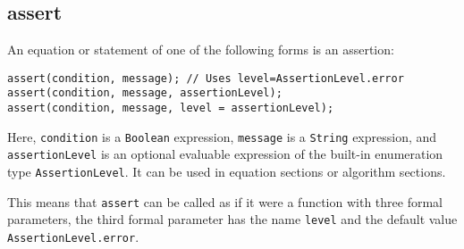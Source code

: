 \subsection{assert}\label{assert}

An equation or statement of one of the following forms is an assertion:
\begin{lstlisting}[language=modelica]
assert(condition, message); // Uses level=AssertionLevel.error
assert(condition, message, assertionLevel);
assert(condition, message, level = assertionLevel);
\end{lstlisting}
Here, \lstinline!condition! is a \lstinline!Boolean! expression, \lstinline!message! is a \lstinline!String! expression, and \lstinline!assertionLevel! is an optional evaluable expression of the built-in enumeration type \lstinline!AssertionLevel!.
It can be used in equation sections or algorithm sections.

\begin{nonnormative}
This means that \lstinline!assert! can be called as if it were a function with three formal parameters, the third formal parameter has the name \lstinline!level! and the default value \lstinline!AssertionLevel.error!.
\end{nonnormative}

